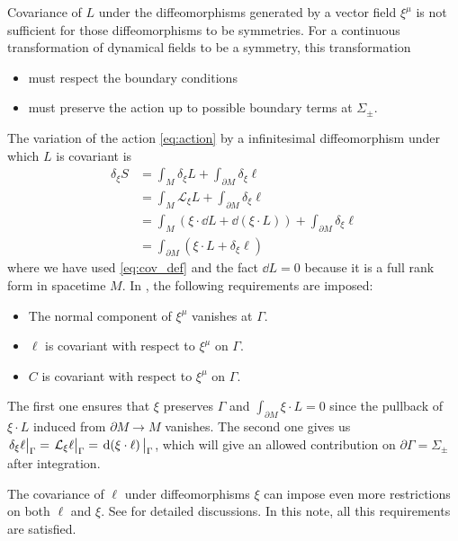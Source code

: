 \documentclass[10pt]{article}
\begin{document}
Covariance of $L$ under the diffeomorphisms generated by a vector field $\xi^\mu$ is not sufficient for those diffeomorphisms to be symmetries.
For a continuous transformation of dynamical fields to be a symmetry, this transformation
\begin{itemize}
    \item must respect the boundary conditions
    \item must preserve the action up to possible boundary terms at $\Sigma_\pm$.
\end{itemize}
The variation of the action \cref{eq:action} by a infinitesimal diffeomorphism under which $L$ is covariant is
\begin{equation}
    \begin{split}
        \delta_\xi S&=\int_M \delta_\xi L+\int_{\partial M}\delta_\xi \ell\\
        &=\int_M \mathcal{L}_\xi L+\int_{\partial M}\delta_\xi \ell\\
        &=\int_M \left(\xi\cdot\dd{L}+\dd(\xi\cdot L)\right)+\int_{\partial M}\delta_\xi \ell\\
        &=\int_{\partial M}\left(\xi\cdot L+\delta_{\xi}\ell\right)
    \end{split}
\end{equation}
where we have used \cref{eq:cov_def} and the fact $\dd{L}=0$ because it is a full rank form in spacetime $M$.
In \cite{Harlow:2019yfa}, the following requirements are imposed:
\begin{itemize}
    \item The normal component of $\xi^\mu$ vanishes at $\Gamma$.
    \item $\ell$ is covariant with respect to $\xi^\mu$ on $\Gamma$.
    \item $C$ is covariant with respect to $\xi^\mu$ on $\Gamma$.
\end{itemize}
The first one ensures that $\xi$ preserves $\Gamma$ and $\int_{\partial M}\xi\cdot L=0$ since the pullback of $\xi\cdot L$ induced from $\partial M\to M$ vanishes. 
The second one gives us $\eval{\delta_\xi\ell}_{\Gamma}=\eval{\mathcal{L}_\xi\ell}_{\Gamma}=\eval{\dd{(\xi\cdot\ell)}}_{\Gamma}$, which will give an allowed contribution on $\partial\Gamma=\Sigma_\pm$ after integration.
\begin{remark}
    The covariance of $\ell$ under diffeomorphisms $\xi$ can impose even more restrictions on both $\ell$ and $\xi$.
    See \cite{Harlow:2019yfa} for detailed discussions.
    In this note, all this requirements are satisfied.
\end{remark}
\end{document}
